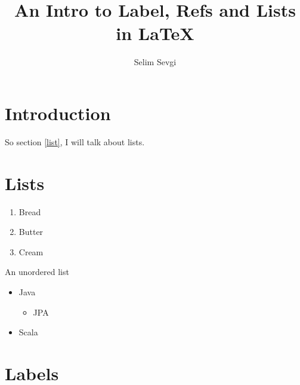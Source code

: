 \documentclass{article}
\author{Selim Sevgi}
\title{An Intro to Label, Refs and Lists in {\LaTeX}}
\begin{document}
\maketitle

\section{Introduction}

So section \ref{list}, I will talk about lists.

\section{Lists\label{list}}

\begin{enumerate}
\item Bread
\item Butter
\item Cream
\end{enumerate}


An unordered list

\begin{itemize}
\item Java
  \begin{itemize}
    \item JPA
  \end{itemize}
\item Scala
\end{itemize}

\section{Labels}
\end{document}
